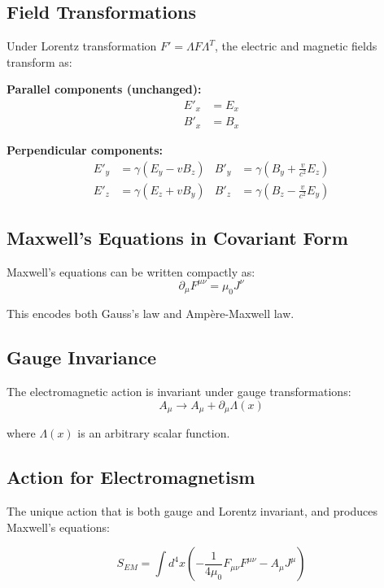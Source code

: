 \documentclass[11pt,a4paper]{article}
\begin{document}
\subsection{Field Transformations}

Under Lorentz transformation $F' = \Lambda F \Lambda^T$, the electric and magnetic fields transform as:

\textbf{Parallel components (unchanged):}
\begin{align}
E'_x &= E_x \\
B'_x &= B_x
\end{align}

\textbf{Perpendicular components:}
\begin{align}
E'_y &= \gamma(E_y - vB_z) & B'_y &= \gamma\left(B_y + \frac{v}{c^2}E_z\right) \\
E'_z &= \gamma(E_z + vB_y) & B'_z &= \gamma\left(B_z - \frac{v}{c^2}E_y\right)
\end{align}

\subsection{Maxwell's Equations in Covariant Form}

Maxwell's equations can be written compactly as:
\begin{equation}
\boxed{\partial_\mu F^{\mu\nu} = \mu_0 J^\nu}
\end{equation}

This encodes both Gauss's law and Ampère-Maxwell law.

\subsection{Gauge Invariance}

The electromagnetic action is invariant under gauge transformations:
\begin{equation}
A_\mu \longrightarrow A_\mu + \partial_\mu \Lambda(x)
\end{equation}

where $\Lambda(x)$ is an arbitrary scalar function.

\subsection{Action for Electromagnetism}

The unique action that is both gauge and Lorentz invariant, and produces Maxwell's equations:

\begin{equation}
S_{EM} = \int d^4x \left( -\frac{1}{4\mu_0} F_{\mu\nu}F^{\mu\nu} - A_\mu J^\mu \right)
\end{equation}
\end{document}
